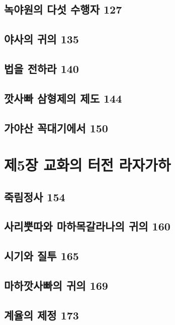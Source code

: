 \documentclass[12pt, a4paper, oneside]{book}
\let\stdsection\section
\renewcommand\section{\newpage\stdsection}
\begin{document}
	\section{녹야원의 다섯 수행자 127 }

	\section{야사의 귀의 135 }

	\section{법을 전하라 140 }

	\section{깟사빠 삼형제의 제도 144 }

	\section{가야산 꼭대기에서 150}





	\chapter{제5장 교화의 터전 라자가하}
	\noptcrule
	\parttoc				

	\section{죽림정사 154 }

	\section{사리뿟따와 마하목갈라나의 귀의 160 }

	\section{시기와 질투 165 }

	\section{마하깟사빠의 귀의 169 }

	\section{계율의 제정 173}
\end{document}
